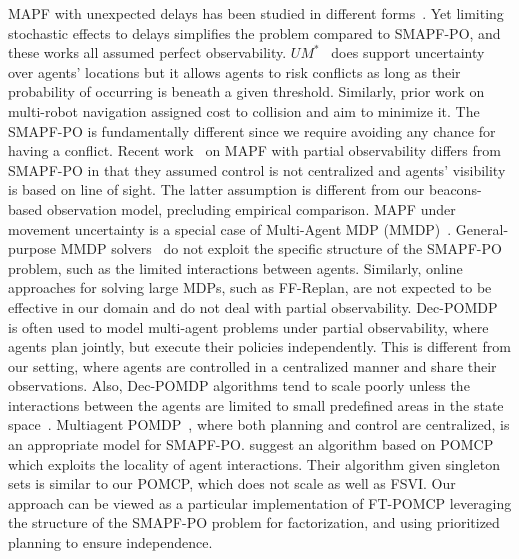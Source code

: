 \documentclass[letterpaper]{article} %
\begin{document}
MAPF with unexpected delays has been studied in different forms~\cite{atzmon2020probabilistic,shahar2021safe,atzmon2020robust,ma2017multiAgent}. Yet limiting stochastic effects to delays simplifies the problem compared to SMAPF-PO, and these works all assumed perfect observability.
$UM^*$~\cite{wagner2017path} does support uncertainty over agents' locations but it allows agents to risk conflicts as long as their probability of occurring is beneath a given threshold. Similarly, prior work on multi-robot navigation assigned cost to collision and aim to minimize it.
The SMAPF-PO is fundamentally different since we require avoiding any chance for having a conflict. %
Recent work~\cite{davydov2021q} on MAPF with partial observability differs from SMAPF-PO in that they assumed control is not centralized and agents' visibility is based on line of sight. The latter assumption is different from our beacons-based observation model, precluding empirical comparison.  MAPF under movement uncertainty is a special case of Multi-Agent MDP (MMDP)~\cite{boutilier1996planning}.
General-purpose MMDP solvers~\cite{de2021constrained} do not exploit the specific structure of the SMAPF-PO problem, such as the limited interactions between agents. Similarly, online approaches for solving large MDPs, such as FF-Replan\cite{yoon2007ff}, are not expected to be effective in our domain and do not deal with partial observability.
Dec-POMDP~\cite{oliehoek2012decentralized} is often used to model multi-agent problems under partial observability, where agents plan jointly, but execute their policies independently.
This is different from our setting, where agents are controlled in a centralized manner and share their observations.
Also, Dec-POMDP algorithms tend to scale poorly unless the interactions between the agents are limited to small predefined areas in the state space~\cite{melo2009learning}.
Multiagent POMDP~\cite{oliehoek2017madp}, where both planning and control are centralized, is an appropriate model for SMAPF-PO.  \citet{amato2015scalable} suggest an algorithm based on POMCP which exploits the locality of agent interactions.
Their algorithm given singleton sets is similar to our POMCP, which does not scale as well as FSVI.
Our approach can be viewed as a particular implementation of FT-POMCP leveraging the structure of the SMAPF-PO problem for factorization, and using prioritized planning to ensure independence.
\end{document}
